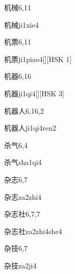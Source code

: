 \begin{entry}{机械}{6,11}
  \begin{phonetics}{机械}{ji1xie4}
  \end{phonetics}
\end{entry}

\begin{entry}{机票}{6,11}
  \begin{phonetics}{机票}{ji1piao4}[][HSK 1]
  \end{phonetics}
\end{entry}

\begin{entry}{机器}{6,16}
  \begin{phonetics}{机器}{ji1qi4}[][HSK 3]
  \end{phonetics}
\end{entry}

\begin{entry}{机器人}{6,16,2}
  \begin{phonetics}{机器人}{ji1qi4ren2}
  \end{phonetics}
\end{entry}

\begin{entry}{杀气}{6,4}
  \begin{phonetics}{杀气}{sha1qi4}
  \end{phonetics}
\end{entry}

\begin{entry}{杂志}{6,7}
  \begin{phonetics}{杂志}{za2zhi4}
  \end{phonetics}
\end{entry}

\begin{entry}{杂志社}{6,7,7}
  \begin{phonetics}{杂志社}{za2zhi4she4}
  \end{phonetics}
\end{entry}

\begin{entry}{杂技}{6,7}
  \begin{phonetics}{杂技}{za2ji4}
  \end{phonetics}
\end{entry}

